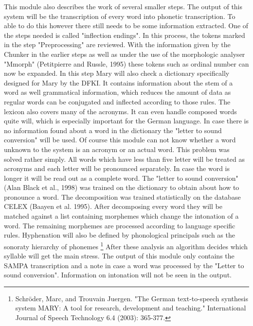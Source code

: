 \documentclass[a4paper, 12pt]{article}
\begin{document}
This module also describes the work of several smaller steps.
The output of this system will be the transcription of every word into phonetic transcription.
To able to do this however there still needs to be some information extracted.
One of the steps needed is called "inflection endings". 
In this process, the tokens marked in the step "Preprocessing" are reviewed.
With the information given by the Chunker in the earlier steps as well as under the use of the morphologic analyser "Mmorph" (Petitpierre and Russle, 1995) these tokens such as ordinal number can now be expanded.\newline 
In this step Mary will also check a dictionary specifically designed for Mary by the DFKI.
It contains information about the stem of a word as well grammatical information, which reduces the amount of data as regular words can be conjugated and inflected according to those rules.
The lexicon also covers many of the acronyms. 
It can even handle composed words quite will, which is especially important for the German language. \newline 
In case there is no information found about a word in the dictionary the "letter to sound conversion" will be used.
Of course this module can not know whether a word unknown to the system is an acronym or an actual word. 
This problem was solved rather simply. 
All words which have less than five letter will be treated as acronyms and each letter will be pronounced separately. 
In case the word is longer it will be read out as a complete word.
The "letter to sound conversion" (Alan Black et al., 1998) was trained on the dictionary to obtain about how to pronounce a word.
The decomposition was trained statistically on the database CELEX (Baayen et al. 1995).
After decomposing every word they will be matched against a list containing morphemes which change the intonation of a word.
The remaining morphemes are processed according to language specific rules.
Hyphenation will also be defined by phonological principals such as the sonoraty hierarchy of phonemes \footnote {Schröder, Marc, and Trouvain Juergen. "The German text-to-speech synthesis system MARY: A tool for research, development and teaching." International Journal of Speech Technology 6.4 (2003): 365-377.} \newline
After these analysis an algorithm decides which syllable will get the main stress.\newline
The output of this module only contains the SAMPA transcription and a note in case a word was processed by the "Letter to sound conversion". 
Information on intonation will not be seen in the output.
\end{document}
